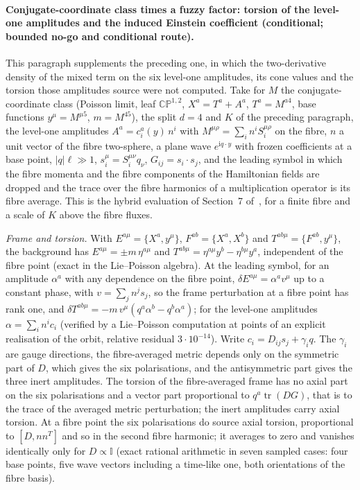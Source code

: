 \paragraph{Conjugate-coordinate class times a fuzzy factor: torsion of the level-one amplitudes and the induced Einstein coefficient (conditional; bounded no-go and conditional route).}
This paragraph supplements the preceding one, in which the two-derivative density of the mixed term on the six level-one amplitudes, its cone values and the torsion those amplitudes source were not computed. Take for \(M\) the conjugate-coordinate class (Poisson limit, leaf \(\mathbb{CP}^{1,2}\), \(X^a=T^a+A^a\), \(T^a=M^{a4}\), base functions \(y^\mu=M^{\mu5}\), \(m=M^{45}\)), the split \(d=4\) and \(K\) of the preceding paragraph, the level-one amplitudes \(A^a=c_i^a(y)\,n^i\) with \(M^{\mu\rho}=\sum_in^iS_i^{\mu\rho}\) on the fibre, \(n\) a unit vector of the fibre two-sphere, a plane wave \(e^{\mathrm iq\cdot y}\) with frozen coefficients at a base point, \(|q|\ell\gg1\), \(s_i^\mu=S_i^{\mu\nu}q_\nu\), \(G_{ij}=s_i\cdot s_j\), and the leading symbol in which the fibre momenta and the fibre components of the Hamiltonian fields are dropped and the trace over the fibre harmonics of a multiplication operator is its fibre average. This is the hybrid evaluation of Section~7 of~\cite{Steinacker2023}, for a finite fibre and a scale of \(K\) above the fibre fluxes.

\emph{Frame and torsion.} With \(E^{a\mu}=\{X^a,y^\mu\}\), \(F^{ab}=\{X^a,X^b\}\) and \(T^{ab\mu}=\{F^{ab},y^\mu\}\), the background has \(E^{a\mu}=\pm m\,\eta^{a\mu}\) and \(T^{ab\mu}=\eta^{a\mu}y^b-\eta^{b\mu}y^a\), independent of the fibre point (exact in the Lie--Poisson algebra). At the leading symbol, for an amplitude \(\alpha^a\) with any dependence on the fibre point, \(\delta E^{a\mu}=\alpha^a v^\mu\) up to a constant phase, with \(v=\sum_jn^js_j\), so the frame perturbation at a fibre point has rank one, and \(\delta T^{ab\mu}=-m\,v^\mu(q^a\alpha^b-q^b\alpha^a)\); for the level-one amplitudes \(\alpha=\sum_in^ic_i\) (verified by a Lie--Poisson computation at points of an explicit realisation of the orbit, relative residual \(3\cdot10^{-14}\)). Write \(c_i=D_{ij}s_j+\gamma_iq\). The \(\gamma_i\) are gauge directions, the fibre-averaged metric depends only on the symmetric part of \(D\), which gives the six polarisations, and the antisymmetric part gives the three inert amplitudes. The torsion of the fibre-averaged frame has no axial part on the six polarisations and a vector part proportional to \(q^a\operatorname{tr}(DG)\), that is to the trace of the averaged metric perturbation; the inert amplitudes carry axial torsion. At a fibre point the six polarisations do source axial torsion, proportional to \([D,nn^{T}]\) and so in the second fibre harmonic; it averages to zero and vanishes identically only for \(D\propto\mathbb I\) (exact rational arithmetic in seven sampled cases: four base points, five wave vectors including a time-like one, both orientations of the fibre basis).

